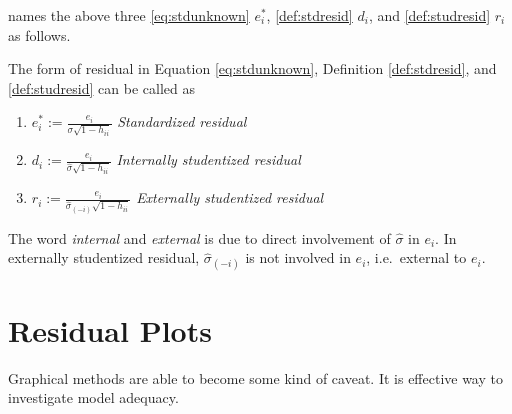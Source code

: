 \documentclass[]{book}
\newenvironment{Shaded}{\begin{snugshade}}{\end{snugshade}}
\newcommand{\CommentTok}[1]{\textcolor[rgb]{0.56,0.35,0.01}{\textit{#1}}}
\newcommand{\ControlFlowTok}[1]{\textcolor[rgb]{0.13,0.29,0.53}{\textbf{#1}}}
\newcommand{\DataTypeTok}[1]{\textcolor[rgb]{0.13,0.29,0.53}{#1}}
\newcommand{\DecValTok}[1]{\textcolor[rgb]{0.00,0.00,0.81}{#1}}
\newcommand{\KeywordTok}[1]{\textcolor[rgb]{0.13,0.29,0.53}{\textbf{#1}}}
\newcommand{\NormalTok}[1]{#1}
\newcommand{\OperatorTok}[1]{\textcolor[rgb]{0.81,0.36,0.00}{\textbf{#1}}}
\newcommand{\StringTok}[1]{\textcolor[rgb]{0.31,0.60,0.02}{#1}}
\theoremstyle{definition}
\theoremstyle{definition}
\theoremstyle{definition}
\theoremstyle{remark}
\let\BeginKnitrBlock\begin \let\EndKnitrBlock\end
\begin{document}
\citet{Chatterjee:2015aa} names the above three \eqref{eq:stdunknown} \(e_i^{\ast}\), \ref{def:stdresid} \(d_i\), and \ref{def:studresid} \(r_i\) as follows.

\BeginKnitrBlock{remark}
{}The form of residual in Equation \eqref{eq:stdunknown}, Definition \ref{def:stdresid}, and \ref{def:studresid} can be called as

\begin{enumerate}
  \item $e_i^{\ast} := \frac{e_i}{\sigma \sqrt{1 - h_{ii}}}$ \textit{Standardized residual}
  \item $d_i := \frac{e_i}{\hat\sigma \sqrt{1 - h_{ii}}}$ \textit{Internally studentized residual}
  \item $r_i := \frac{e_i}{\hat\sigma_{(-i)} \sqrt{1 - h_{ii}}}$ \textit{Externally studentized residual}
\end{enumerate}
\EndKnitrBlock{remark}

The word \emph{internal} and \emph{external} is due to direct involvement of \(\hat\sigma\) in \(e_i\). In externally studentized residual, \(\hat\sigma_{(-i)}\) is not involved in \(e_i\), i.e.~external to \(e_i\).

\hypertarget{residual-plots}{%
\section{Residual Plots}\label{residual-plots}}

Graphical methods are able to become some kind of caveat. It is effective way to investigate model adequacy.

\begin{Shaded}
\end{Shaded}
\end{document}
